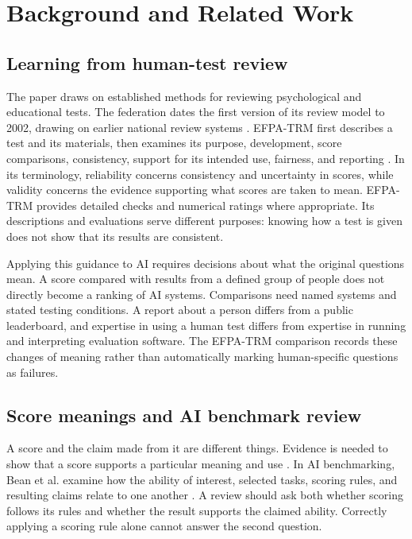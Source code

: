 \documentclass[10pt,conference]{IEEEtran}
\begin{document}
\section{Background and Related Work}
\subsection{Learning from human-test review}
The paper draws on established methods for reviewing psychological and educational tests. The federation dates the first version of its review model to 2002, drawing on earlier national review systems \cite{efpa_test_review_model_2025}. EFPA-TRM first describes a test and its materials, then examines its purpose, development, score comparisons, consistency, support for its intended use, fairness, and reporting \cite{efpa_test_review_model_2025}. In its terminology, reliability concerns consistency and uncertainty in scores, while validity concerns the evidence supporting what scores are taken to mean. EFPA-TRM provides detailed checks and numerical ratings where appropriate. Its descriptions and evaluations serve different purposes: knowing how a test is given does not show that its results are consistent.

Applying this guidance to AI requires decisions about what the original questions mean. A score compared with results from a defined group of people does not directly become a ranking of AI systems. Comparisons need named systems and stated testing conditions. A report about a person differs from a public leaderboard, and expertise in using a human test differs from expertise in running and interpreting evaluation software. The EFPA-TRM comparison records these changes of meaning rather than automatically marking human-specific questions as failures.

\subsection{Score meanings and AI benchmark review}
A score and the claim made from it are different things. Evidence is needed to show that a score supports a particular meaning and use \cite{kane_validation,aera_apa_ncme_standards_2014}. In AI benchmarking, Bean et al. examine how the ability of interest, selected tasks, scoring rules, and resulting claims relate to one another \cite{bean_measuring_what_matters}. A review should ask both whether scoring follows its rules and whether the result supports the claimed ability. Correctly applying a scoring rule alone cannot answer the second question.
\end{document}
